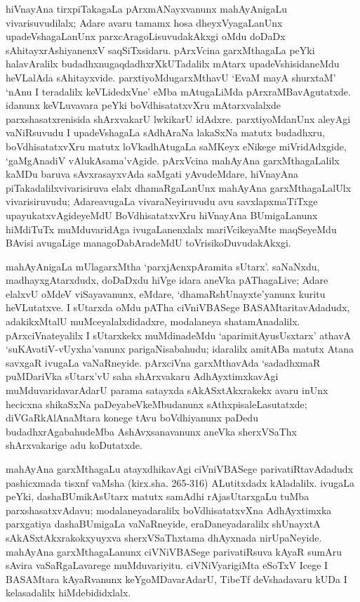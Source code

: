 hiVnayAna tirxpiTakagaLa pArxmANayxvanunx mahAyAnigaLu vivarisuvudilalx; Adare avaru tamamx hosa dheyxVyagaLanUnx upadeVshagaLanUnx parxcAragoLisuvudakAkxgi oMdu doDaDx sAhitayxrAshiyanenxV saqSiTxsidaru. pArxVcina garxMthagaLa peYki halavAralilx  \hbox{budadhxnu}\break gaqdadhxrX\-kUTadalilx mAtarx upadeVshisidaneMdu heVLalAda sAhitayxvide. parxtiyoMdu\break garxMthavU `EvaM mayA shurxtaM' `nAnu I teradalilx keVLidedxVne' eMba mAtugaLiMda pArxraMBavAgutatxde. idanunx keVLuvavara peYki boVdhisatatxvXru mAtarxvalalxde parxshasatxrenisida shArxvakarU lwkikarU idAdxre. parxtiyoMdanUnx aleyAgi vaNiRsuvudu I upa\-deVshagaLa sAdhAraNa lakaSxNa matutx budadhxru, boVdhisatatxvXru matutx loVkadhAtugaLa saMKeyx eNikege miVridAdxgide, `gaMgAnadiV vAlukAsama'vAgide. pArxVcina mahAyAna garxMtha\break\-gaLalilx kaMDu baruva  sAvxrasayxvAda saMgati yAvudeMdare, hiVnayAna piTakadalilx\break vivarisiruva elalx dhamaRgaLanUnx mahAyAna garxMthagaLalUlx vivarisiruvudu; Adare\break avugaLa vivaraNeyiruvudu avu savxlapxmaTiTxge upayukatxvAgideyeMdU BoVdhi\break\-satatxvXru hiVnayAna BUmigaLanunx hiMdiTuTx muMduvaridAga ivugaLanenxlalx mariV\-cike\-yaMte maqSeyeMdu BAvisi avugaLige managoDabAradeMdU toVrisikoDuvu\-dakAkxgi.

mahAyAnigaLa mUlagarxMtha `parxjAcnxpAramita sUtarx'. saNaNxdu, madhayxgAtarxdudx, doDaDxdu hiVge idara aneVka pAThagaLive; Adare elalxvU oMdeV viSayavanunx, eMdare, `dhamaRshUnayxte'yanunx kuritu heVLutatxve. I sUtarxda oMdu pATha ciVniVBASege BASAMtaritavAdadudx, adakikxMtalU muMceyalalxdidadxre, modalaneya shatamAnadalilx. pArxciVnateyalilx I sUtarxkekx muMdinadeMdu `aparimitAyusUsxtarx' athavA `suKAvatiV-vUyxha'vanunx parigaNisabahudu; idaralilx amitABa matutx Atana savxgaR ivugaLa vaNaRneyide. pArxciVna garxMthavAda `sadadhxmaR puMDariVka sUtarx'vU saha shArxvakaru AdhAyxtimxkavAgi muMduvaridavarAdarU parama satayxda sAkASxtAkxrakekx avaru inUnx hecicxna shikaSxNa paDeyabeVkeMbudanunx sAthxpisaleLasutatxde; diVGaRkAlAnaMtara konege tAvu boVdhiyanunx paDedu budadhxrAgabahudeMba AshAvxsanavanunx aneVka sherxVSaThx shArxvakarige adu koDutatxde.

mahAyAna garxMthagaLu atayxdhikavAgi ciVniVBASege parivatiRtavAdadudx pashicxmada tisxnf vaMsha (kirx.sha. 265-316) ALutitxdadx kAladalilx. ivugaLa peYki, dashaBUmikA\-sUtarx matutx samAdhi rAjasUtarxgaLu tuMba parxshasatxvAdavu; modalaneyadaralilx boVdhisatatxvXna AdhAyxtimxka parxgatiya dashaBUmigaLa vaNaRneyide, eraDaneyadaralilx shUnayxtA sAkASxtAkxrakokxyuyxva sherxVSaThxtama dhAyxnada nirUpaNeyide. mahAyAna garxMthagaLanunx ciVNiVBASege parivatiRsuva kAyaR sumAru sAvira vaSaRgaLavarege muMduvariyitu. ciVNiVyarigiMta eSoTxV Icege I BASAMtara kAyaRvanunx keYgoMDavarAdarU, TibeTf deVshadavaru kUDa I kelasadalilx hiMdebididxlalx.

